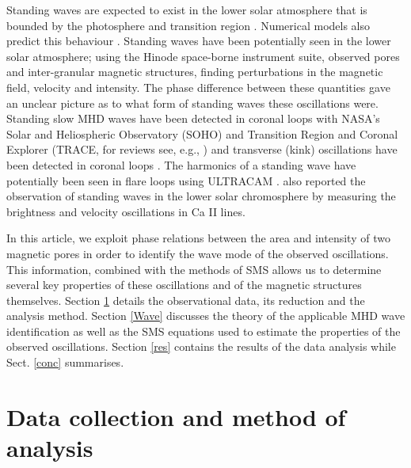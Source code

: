     Standing waves are expected to exist in the lower solar atmosphere that is bounded by the photosphere and transition region \citep{mein,leibacher}. Numerical models also predict this behaviour \citep{zhugzhda1,erdelyi,malins}.
    Standing waves have been potentially seen in the lower solar atmosphere; using the Hinode space-borne instrument suite, \citet{PMHDW} observed pores and inter-granular magnetic structures, finding perturbations in the magnetic field, velocity and intensity.
    The phase difference between these quantities gave an unclear picture as to what form of standing waves these oscillations were.
    Standing slow MHD waves have been detected in coronal loops with NASA's Solar and Heliospheric Observatory (SOHO) and Transition Region and Coronal Explorer (TRACE, for reviews see, e.g., \citealp{wang2011standing,2012RSPTA.370.3193D}) and transverse (kink) oscillations have been detected in coronal loops \citep[e.g][for a review see \citealp{Andries2009,Ruderman2009}]{1999ApJ520880A,taroyan,oshea,2008ApJ...687L..45V}.
    The harmonics of a standing wave have potentially been seen in flare loops using ULTRACAM \citep[e.g.,][]{mathioudakis}.
    \citet{fleck} also reported the observation of standing waves in the lower solar chromosphere by measuring the  brightness and velocity oscillations in Ca II lines. 
    
    In this article, we exploit phase relations between the area and intensity of two magnetic pores in order to identify the wave mode of the observed oscillations.
    This information, combined with the methods of SMS allows us to determine several key properties of these oscillations and  of the magnetic structures themselves.
    Section \ref{DnA} details the observational data, its reduction and the analysis method.
    Section \ref{Wave} discusses the theory of the applicable MHD wave identification as well as the SMS equations used to estimate the properties of the observed oscillations.
    Section \ref{res} contains the results of the data analysis while Sect. \ref{conc} summarises.  
    
\section{Data collection and method of analysis}
\label{DnA}

